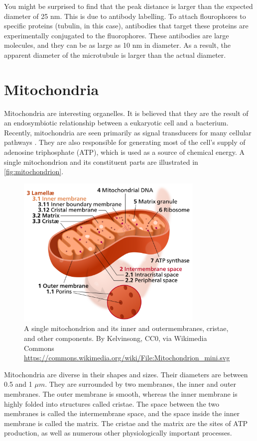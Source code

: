 \documentclass[10pt,a4paper,oneside]{book}
\begin{document}
You might be surprised to find that the peak distance is larger than the expected diameter of 25 nm. This is due to antibody labelling. To attach flourophores to specific proteins (tubulin, in this case), antibodies that target these proteins are experimentally conjugated to the fluorophores. These antibodies are large molecules, and they can be as large as 10 nm in diameter. As a result, the apparent diameter of the microtubule is larger than the actual diameter.

\section{Mitochondria}

Mitochondria are interesting organelles. It is believed that they are the result of an endosymbiotic relationship between a eukaryotic cell and a bacterium. Recently, mitochondria are seen primarily as signal transducers for many cellular pathways \cite{picard-cellmetabolism-2022}. They are also responsible for generating most of the cell's supply of adenosine triphosphate (ATP), which is used as a source of chemical energy. A single mitochondrion and its constituent parts are illustrated in \autoref{fig:mitochondrion}.

\begin{figure}[ht]
    \centering
    \includegraphics[width=0.8\textwidth]{mitochondrion.png}
    \caption{A single mitochondrion and its inner and outermembranes, cristae, and other components. By Kelvinsong, CC0, via Wikimedia Commons \url{https://commons.wikimedia.org/wiki/File:Mitochondrion_mini.svg}}
    \label{fig:mitochondrion}
\end{figure}

Mitochondria are diverse in their shapes and sizes. Their diameters are between 0.5 and 1 $\mu m$. They are surrounded by two membranes, the inner and outer membranes. The outer membrane is smooth, whereas the inner membrane is highly folded into structures called cristae. The space between the two membranes is called the intermembrane space, and the space inside the inner membrane is called the matrix. The cristae and the matrix are the sites of ATP production, as well as numerous other physiologically important processes.
\end{document}
